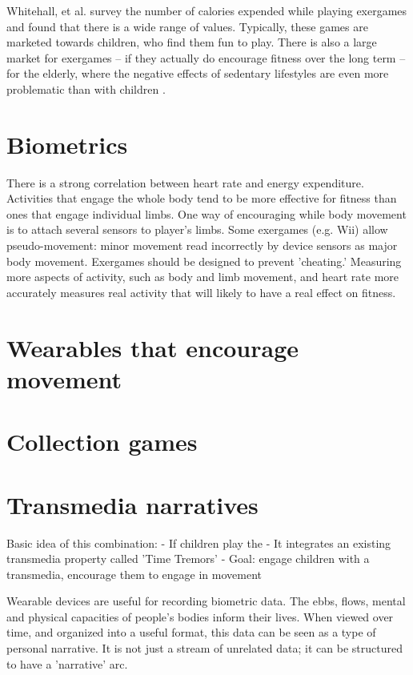 \documentclass{SIGCHI2015LaTex/sigchi}
\begin{document}
Whitehall, et al. survey the number of calories expended while playing exergames and found that there is a wide range of values. Typically, these games are marketed towards children, who find them fun to play. There is also a large market for exergames -- if they actually do encourage fitness over the long term -- for the elderly, where the negative effects of sedentary lifestyles are even more problematic than with children \cite{vonstad2014exergaming}. 

\section{Biometrics}
There is a strong correlation between heart rate and energy expenditure\cite{whitehead2010exergame}. Activities that engage the whole body tend to be more effective for fitness than ones that engage individual limbs. One way of encouraging while body movement is to attach several sensors to player's limbs. Some exergames (e.g. Wii) allow pseudo-movement: minor movement read incorrectly by device sensors as major body movement. Exergames should be designed to prevent 'cheating.' Measuring more aspects of activity, such as body and limb movement, and heart rate more accurately measures real activity that will likely to have a real effect on fitness. 

\section{Wearables that encourage movement}

\section{Collection games}



\section{Transmedia narratives}

Basic idea of this combination:
- If children play the 
- It integrates an existing transmedia property called 'Time Tremors'
- Goal: engage children with a transmedia, encourage them to engage in movement

Wearable devices are useful for recording biometric data. The ebbs, flows, mental and physical capacities of people's bodies inform their lives. When viewed over time, and organized into a useful format, this data can be seen as a type of personal narrative. It is not just a stream of unrelated data; it can be structured to have a 'narrative' arc. 
\end{document}
